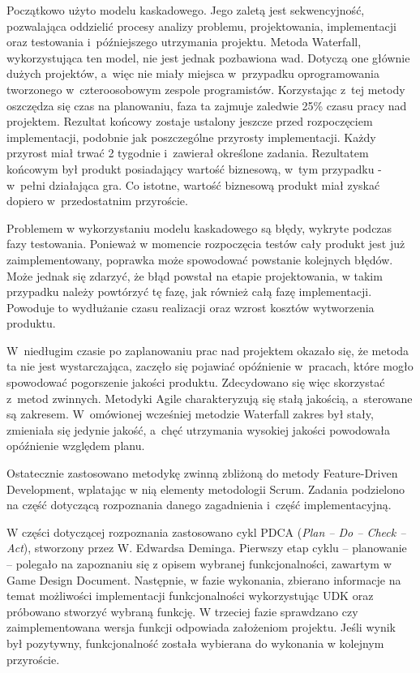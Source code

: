 Początkowo użyto modelu kaskadowego. Jego zaletą jest sekwencyjność, pozwalająca oddzielić procesy analizy problemu, projektowania, implementacji oraz testowania i~późniejszego utrzymania projektu. Metoda Waterfall, wykorzystująca ten model, nie jest jednak pozbawiona wad. 
Dotyczą one głównie dużych projektów, a~więc nie miały miejsca w~przypadku oprogramowania tworzonego w~czteroosobowym zespole programistów. Korzystając z~tej metody oszczędza się czas na planowaniu, faza ta zajmuje zaledwie 25\% czasu pracy nad projektem. Rezultat końcowy zostaje ustalony jeszcze przed rozpoczęciem implementacji, podobnie jak poszczególne przyrosty implementacji. Każdy przyrost miał trwać 2 tygodnie i~zawierał określone zadania. Rezultatem końcowym był produkt posiadający wartość biznesową, w~tym przypadku - w~pełni działająca gra. Co istotne, wartość biznesową produkt miał zyskać dopiero w~przedostatnim przyroście. 

Problemem w wykorzystaniu modelu kaskadowego są błędy, wykryte podczas fazy testowania. Ponieważ w momencie rozpoczęcia testów cały produkt jest już zaimplementowany, poprawka może spowodować powstanie kolejnych błędów. Może jednak się zdarzyć, że błąd powstał na etapie projektowania, w takim przypadku należy powtórzyć tę fazę, jak również całą fazę implementacji. Powoduje to wydłużanie czasu realizacji oraz wzrost kosztów wytworzenia produktu.

W~niedługim czasie po zaplanowaniu prac nad projektem okazało się, że metoda ta nie jest wystarczająca, zaczęło się pojawiać opóźnienie w~pracach, które mogło spowodować pogorszenie jakości produktu. Zdecydowano się więc skorzystać z~metod zwinnych. Metodyki Agile charakteryzują się stałą jakością, a~sterowane są zakresem. W~omówionej wcześniej metodzie Waterfall zakres był stały, zmieniała się jedynie jakość, a~chęć utrzymania wysokiej jakości powodowała opóźnienie względem planu. 

Ostatecznie zastosowano metodykę zwinną zbliżoną do metody Feature-Driven Development, wplatając w nią elementy metodologii Scrum. Zadania podzielono na część dotyczącą rozpoznania danego zagadnienia i~część implementacyjną. 

W części dotyczącej rozpoznania zastosowano cykl PDCA (\emph{Plan -- Do -- Check -- Act}), stworzony przez W. Edwardsa Deminga. Pierwszy etap cyklu -- planowanie -- polegało na zapoznaniu się z opisem wybranej funkcjonalności, zawartym w Game Design Document. Następnie, w fazie wykonania, zbierano informacje na temat możliwości implementacji funkcjonalności wykorzystując UDK oraz próbowano stworzyć wybraną funkcję. W trzeciej fazie sprawdzano czy zaimplementowana wersja funkcji odpowiada założeniom projektu. Jeśli wynik był pozytywny, funkcjonalność została wybierana do wykonania w kolejnym przyroście.

